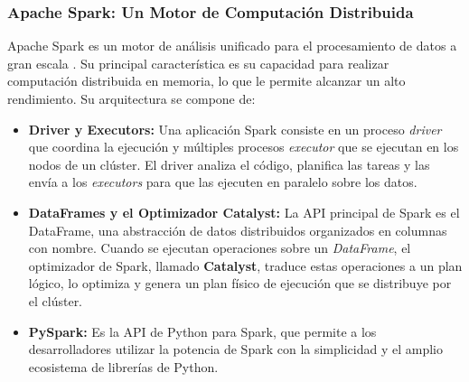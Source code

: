 \subsubsection{Apache Spark: Un Motor de Computación Distribuida}
Apache Spark es un motor de análisis unificado para el procesamiento de datos a gran escala \cite{SparkWebDoc}. Su principal característica es su capacidad para realizar computación distribuida en memoria, lo que le permite alcanzar un alto rendimiento. Su arquitectura se compone de:
\begin{itemize}
    \item \textbf{Driver y Executors:} Una aplicación Spark consiste en un proceso \textit{driver} que coordina la ejecución y múltiples procesos \textit{executor} que se ejecutan en los nodos de un clúster. El driver analiza el código, planifica las tareas y las envía a los \textit{executors} para que las ejecuten en paralelo sobre los datos.
    \item \textbf{DataFrames y el Optimizador Catalyst:} La API principal de Spark es el DataFrame, una abstracción de datos distribuidos organizados en columnas con nombre. Cuando se ejecutan operaciones sobre un \textit{DataFrame}, el optimizador de Spark, llamado \textbf{Catalyst}, traduce estas operaciones a un plan lógico, lo optimiza y genera un plan físico de ejecución que se distribuye por el clúster.
    \item \textbf{PySpark:} Es la API de Python para Spark, que permite a los desarrolladores utilizar la potencia de Spark con la simplicidad y el amplio ecosistema de librerías de Python.
\end{itemize}